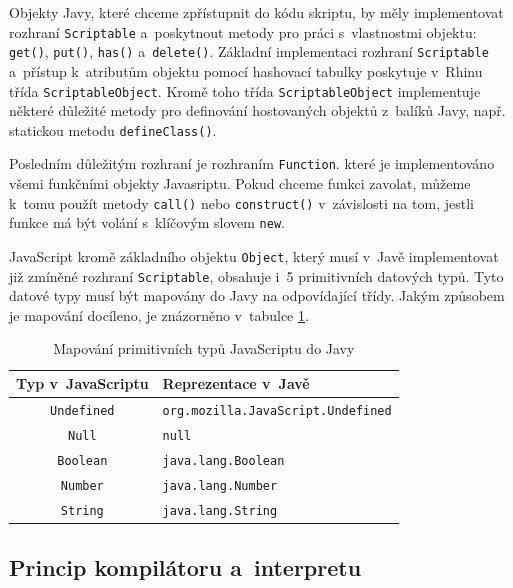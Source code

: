 Objekty Javy, které chceme zpřístupnit do kódu skriptu, by měly implementovat rozhraní \texttt{Scriptable} a~poskytnout metody pro práci s~vlastnostmi objektu: \texttt{get()}, \texttt{put()}, \texttt{has()} a~\texttt{delete()}. Základní implementaci rozhraní \texttt{Scriptable} a~přístup k~atributům objektu pomocí hashovací tabulky poskytuje v~Rhinu třída \texttt{ScriptableObject}. Kromě toho třída \texttt{ScriptableObject} implementuje některé důležité metody pro definování hostovaných objektů z~balíků Javy, např. statickou metodu \texttt{defineClass()}.

Posledním důležitým rozhraní je rozhraním \texttt{Function}. které je implementováno všemi funkčními objekty Javasriptu. Pokud chceme funkci zavolat, můžeme k~tomu použít metody \texttt{call()} nebo \texttt{construct()} v~závislosti na tom, jestli funkce má být volání s~klíčovým slovem \texttt{new}.

JavaScript kromě základního objektu \texttt{Object}, který musí v~Javě implementovat již zmíněné rozhraní \texttt{Scriptable}, obsahuje i~5 primitivních datových typů. Tyto datové typy musí být mapovány do Javy na odpovídající třídy. Jakým způsobem je mapování docíleno, je znázorněno v~tabulce \ref{Table.JavaScriptToJavaMapping}. 

\begin{table}[H]
  \begin{center} 
    \begin{tabular}{| c | l |} \hline
    \textbf{Typ v~JavaScriptu} & \textbf{Reprezentace v~Javě} \\ \hline
    \texttt{Undefined} & \texttt{org.mozilla.JavaScript.Undefined} \\ \hline
    \texttt{Null} & \texttt{null} \\ \hline
    \texttt{Boolean} & \texttt{java.lang.Boolean}  \\ \hline
    \texttt{Number} & \texttt{java.lang.Number} \\ \hline
    \texttt{String} & \texttt{java.lang.String} \\ \hline
    \end{tabular}
    \caption{Mapování primitivních typů JavaScriptu do Javy \protect\cite{Bibliography.ZdrojakRhino}}
    \label{Table.JavaScriptToJavaMapping}
  \end{center}
\end{table}

\subsection{Princip kompilátoru a~interpretu}
\label{Chapter.JavaScriptInJavaAnalysis.Rhino.CompilerTechniques}

